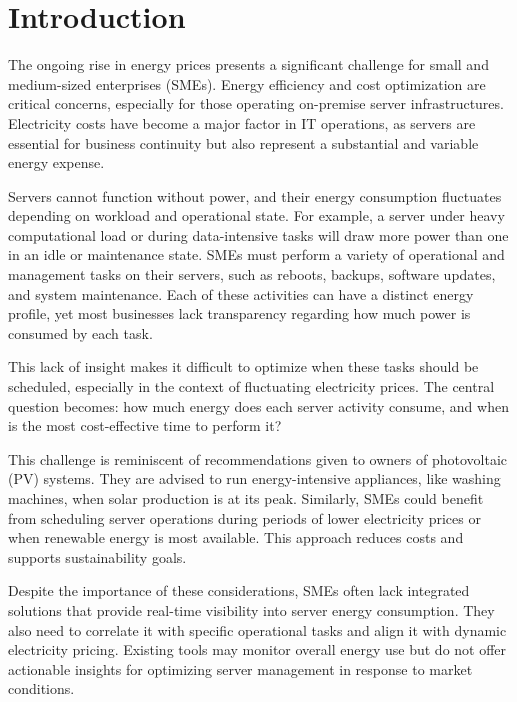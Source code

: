 
\section{Introduction}

The ongoing rise in energy prices presents a significant challenge for small and medium-sized enterprises (SMEs). Energy efficiency and cost optimization are critical concerns, especially for those operating on-premise server infrastructures. Electricity costs have become a major factor in IT operations, as servers are essential for business continuity but also represent a substantial and variable energy expense.

Servers cannot function without power, and their energy consumption fluctuates depending on workload and operational state. For example, a server under heavy computational load or during data-intensive tasks will draw more power than one in an idle or maintenance state. SMEs must perform a variety of operational and management tasks on their servers, such as reboots, backups, software updates, and system maintenance. Each of these activities can have a distinct energy profile, yet most businesses lack transparency regarding how much power is consumed by each task.

This lack of insight makes it difficult to optimize when these tasks should be scheduled, especially in the context of fluctuating electricity prices. The central question becomes: how much energy does each server activity consume, and when is the most cost-effective time to perform it?

This challenge is reminiscent of recommendations given to owners of photovoltaic (PV) systems. They are advised to run energy-intensive appliances, like washing machines, when solar production is at its peak. Similarly, SMEs could benefit from scheduling server operations during periods of lower electricity prices or when renewable energy is most available. This approach reduces costs and supports sustainability goals.

Despite the importance of these considerations, SMEs often lack integrated solutions that provide real-time visibility into server energy consumption. They also need to correlate it with specific operational tasks and align it with dynamic electricity pricing. Existing tools may monitor overall energy use but do not offer actionable insights for optimizing server management in response to market conditions.

